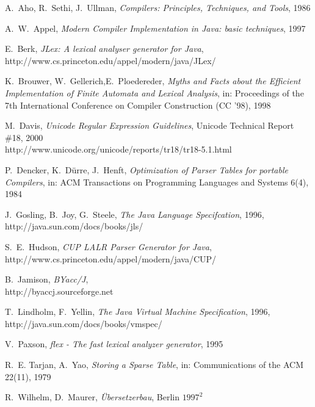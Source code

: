 \documentclass[11pt]{scrartcl}
\newcommand{\trit}{\em}
\begin{document}
\newpage  
\begin{thebibliography}{[00]} 
\label{References} 

  A.~Aho, R.~Sethi, J.~Ullman, {\trit Compilers: Principles, Techniques, and Tools}, 1986


  A.~W.~Appel, {\trit Modern Compiler Implementation in Java: basic techniques}, 1997

 E.~Berk, {\trit JLex: A lexical analyser generator for Java},\\
                   {http://www.cs.princeton.edu/appel/modern/java/JLex/}


  K.~Brouwer, W.~Gellerich,E.~Ploedereder, 
  {\trit Myths and Facts about the Efficient Implementation of Finite Automata and Lexical Analysis}, 
  in: Proceedings of the 7th International Conference on Compiler Construction (CC '98), 1998

  M.~Davis, {\trit Unicode Regular Expression Guidelines}, Unicode Technical Report \#18, 2000\\ 
                    {http://www.unicode.org/unicode/reports/tr18/tr18-5.1.html}

 P.~Dencker, K.~D{\"u}rre, J.~Henft, {\trit Optimization of Parser Tables for portable Compilers}, 
 in: ACM Transactions on Programming Languages and Systems 6(4), 1984

  J.~Gosling, B.~Joy, G.~Steele, {\trit The Java Language Specifcation}, 1996,\\
                    {http://java.sun.com/docs/books/jls/}

  S.~E.~Hudson, {\trit CUP LALR Parser Generator for Java},\\  
  {http://www.cs.princeton.edu/appel/modern/java/CUP/}

  B.~Jamison, {\trit BYacc/J},\\
  {http://byaccj.sourceforge.net}
  
 T.~Lindholm, F.~Yellin, {\trit The Java Virtual Machine Specification}, 1996,\\
                   {http://java.sun.com/docs/books/vmspec/}
 
 V.~Paxson, {\trit flex - The fast lexical analyzer generator}, 1995

  R.~E. Tarjan, A.~Yao, {\trit Storing a Sparse Table}, in: Communications of the ACM 22(11), 1979 

  R.~Wilhelm, D.~Maurer, {\trit {\"U}bersetzerbau}, Berlin $1997^2$

\end{thebibliography}
\end{document}
